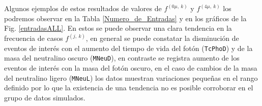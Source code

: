 Algunos ejemplos de estos resultados de valores de $f^{(0\mu,~k)} $ y $f^{(4\mu,~k)} $ los podremos observar en la Tabla \ref{Numero_de_Entradas} y en los gráficos de la Fig. \ref{entradasALL}. En estos se puede observar una clara tendencia en la frecuencia de casos $f^{(j,~k)} $, en general se puede constatar la disminución de eventos de interés con el aumento del tiempo de vida del fotón  (\texttt{TcPhoD}) y de la masa del neutralino oscuro (\texttt{MNeuD}), en contraste se registra aumento de los eventos de interés con la masa del fotón oscuro, en el caso de cambios de la masa del neutralino ligero (\texttt{MNeuL}) los datos muestran variaciones pequeñas en el rango definido por lo que la existencia de una tendencia no es posible corroborar en el grupo de datos simulados.


